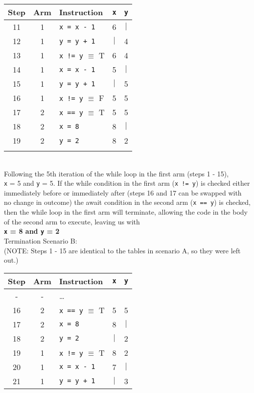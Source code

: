 \documentclass[11pt]{article}
\newcommand{\code}[1]{\texttt{#1}}
\begin{document}
\begin{enumerate}
\begin{enumerate}
\begin{tabular}{c |c | l | c | c }
		\end{tabular}\hspace{0.8cm}
	\begin{tabular}{c |c | l | c | c }
		Step & Arm & Instruction	&	\code{x}	&  \code{y}	\\
		\hline
		11 	& 1 & \code{x = x - 1}			&	6	&	$|$\\
		12	& 1 & \code{y = y + 1}			&	$|$	&	4\\
		13 	& 1 & \code{x != y} $\equiv$ T	&	6	&	4\\
		14 	& 1 & \code{x = x - 1}			&	5	&	$|$\\
		15 	& 1 & \code{y = y + 1}			&	$|$	&	5\\
		16 	& 1 & \code{x != y} $\equiv$ F	&	5	&	5\\
		17 	& 2 & \code{x == y} $\equiv$ T	&	5	&	5\\
		18 	& 2 & \code{x = 8}				&	8	&	$|$\\
		19 	& 2 & \code{y = 2}				&	8	&	2\\
		&&&&\\
		
		
	\end{tabular}\\
	
		
	\hspace{0.8cm}Following the 5th iteration of the while loop in the first arm (steps 1 - 15),\\
	\code{x} = 5 and \code{y} = 5. If the while condition in the first arm (\code{x != y}) is checked either immediately before or immediately after (steps 16 and 17 can be swapped with no change in outcome) the await condition in the second arm (\code{x == y}) is checked, then the while loop in the first arm will terminate, allowing the code in the body of the second arm to execute, leaving us with \\
	\textbf{\code{x} = 8 and \code{y} = 2}\\
	
	Termination Scenario B: \\
	(NOTE: Steps 1 - 15 are identical to the tables in scenario A, so they were left out.)\\
	
	\begin{tabular}{c |c | l | c | c }
		Step & Arm & Instruction	&	\code{x}	&  \code{y}	\\
		\hline
		- 	& - & \ldots & & \\
		16 	& 2 & \code{x == y} $\equiv$ T	&	5	&	5\\
		17 	& 2 & \code{x = 8}				&	8	&	$|$\\
		18 	& 2 & \code{y = 2}				&	$|$	&	2\\
		19 	& 1 & \code{x != y} $\equiv$ T	&	8	&	2\\
		20 	& 1 & \code{x = x - 1}			&	7	&	$|$\\
		21 	& 1 & \code{y = y + 1}			&	$|$	&	3\\
		

\end{tabular}
\end{enumerate}
\end{enumerate}
\end{document}

